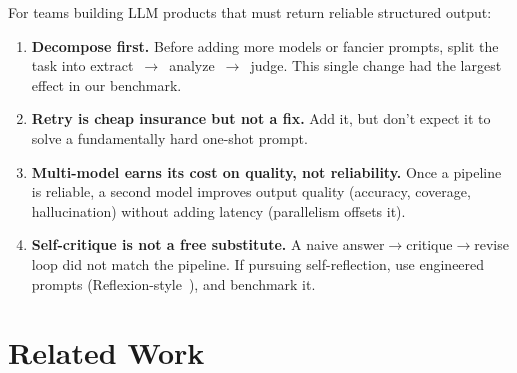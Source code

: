 \documentclass[11pt]{article}
\begin{document}
For teams building LLM products that must return reliable structured output:

\begin{enumerate}
  \item \textbf{Decompose first.} Before adding more models or fancier prompts,
        split the task into extract~$\rightarrow$~analyze~$\rightarrow$~judge.
        This single change had the largest effect in our benchmark.
  \item \textbf{Retry is cheap insurance but not a fix.} Add it, but don't expect
        it to solve a fundamentally hard one-shot prompt.
  \item \textbf{Multi-model earns its cost on quality, not reliability.} Once a
        pipeline is reliable, a second model improves output quality (accuracy,
        coverage, hallucination) without adding latency (parallelism offsets it).
  \item \textbf{Self-critique is not a free substitute.} A naive
        answer$\rightarrow$critique$\rightarrow$revise loop did not match the
        pipeline. If pursuing self-reflection, use engineered prompts
        (Reflexion-style~\citep{shinn2023reflexion}), and benchmark it.
\end{enumerate}

\section{Related Work}
\label{sec:related}
\end{document}
